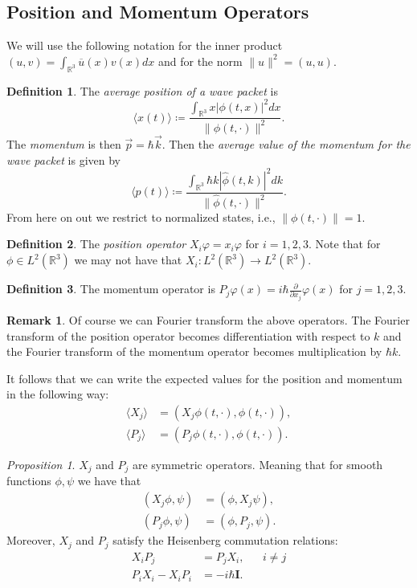 \documentclass[leqno]{article}
\theoremstyle{definition}
\newtheorem{definition}{Definition}[section]
\newtheorem*{remark}{Remark}
\theoremstyle{remark}
\theoremstyle{theorem}
\newtheorem{proposition}{Proposition}
\newcommand{\R}{\mathbb{R}}
\begin{document}
\subsection{Position and Momentum Operators}

We will use the following notation for the inner product $(u,v)=\int_{\R^3} \overline{u}(x)v(x)dx$ and for the norm $\|u\|^2=(u,u)$.

\begin{definition}
The \emph{average position of a wave packet} is 
\[
\langle x(t) \rangle \coloneqq \frac{\int_{\R^3}x |\phi(t,x)|^2 dx}{\|\phi(t,\cdot)\|^2}.
\]
The \emph{momentum} is then $\vec{p}=\hbar \vec{k}$.  Then the \emph{average value of the momentum for the wave packet} is given by
\[
\langle p(t) \rangle \coloneqq \frac{\int_{\R^3} \hbar k |\hat{\phi}(t,k)|^2 dk}{\|\hat{\phi}(t,\cdot)\|^2}.  
\]
From here on out we restrict to normalized states, i.e., $\|\phi(t,\cdot)\|=1$.
\end{definition}

\begin{definition}
The \emph{position operator} $X_i \varphi = x_i \varphi$ for $i=1,2,3$.  Note that for $\phi \in L^2(\R^3)$ we may not have that $X_i \colon L^2(\R^3) \to L^2(\R^3)$. 
\end{definition}

\begin{definition}
The momentum operator is $P_j \varphi(x) = i\hbar \frac{\partial}{\partial x_j} \varphi(x)$ for $j=1,2,3$. 
\end{definition}

\begin{remark}
Of course we can Fourier transform the above operators.  The Fourier transform of the position operator becomes differentiation with respect to $k$ and the Fourier transform of the momentum operator becomes multiplication by $\hbar k$.  
\end{remark}

It follows that we can write the expected values for the position and momentum in the following way:
\begin{align*}
\langle X_j \rangle &= (X_j \phi(t,\cdot),\phi(t,\cdot)),\\
\langle P_j \rangle &= (P_j \phi(t,\cdot),\phi(t,\cdot)).
\end{align*}

\begin{proposition}
$X_j$ and $P_j$ are symmetric operators.  Meaning that for smooth functions $\phi,\psi$ we have that
\begin{align*}
(X_j \phi,\psi) &= (\phi, X_j \psi),\\
(P_j \phi,\psi) &= (\phi, P_j,\psi).
\end{align*}
Moreover, $X_j$ and $P_j$ satisfy the Heisenberg commutation relations:
\begin{align*}
X_i P_j &= P_j X_i,  && i\neq j\\
P_iX_i - X_i P_i &= -i\hbar \mathbf{I}.
\end{align*}
\end{proposition}
\end{document}
